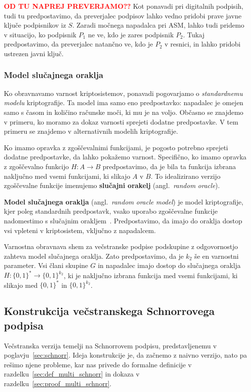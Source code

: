 \documentclass[isrm2, tisk]{fmfdelo}
\newcommand{\todo}[1]{\textcolor{red}{\textbf{\uppercase{#1}??}}}
\begin{document}
\todo{od tu naprej preverjamo}
Kot ponavadi pri digitalnih podpisih, tudi tu predpostavimo, da preverjalec podpisov lahko vedno 
pridobi prave javne ključe podpisnikov iz $S$. Zaradi močnega napadalca pri ASM, lahko tudi pridemo 
v situacijo, ko podpisnik $P_1$ ne ve, kdo je zares podpisnik $P_2$. Tukaj predpostavimo, da preverjalec
natančno ve, kdo je $P_2$ v resnici, in lahko pridobi ustrezen javni ključ. 

\subsubsection{Model slučajnega oraklja}
Ko obravnavamo varnost kriptosistemov, ponavadi pogovarjamo o \textit{standardnemu modelu} kriptografije. 
Ta model ima samo eno predpostavko: napadalec je omejen samo s časom in količino računske moči, ki mu 
je na voljo. Občasno se znajdemo v primeru, ko moramo za dokaz varnosti sprejeti dodatne predpostavke. 
V tem primeru se znajdemo v alternativnih modelih kriptografije. 

Ko imamo opravka z zgoščevalnimi funkcijami, je pogosto potrebno sprejeti dodatne predpostavke, da lahko 
pokažemo varnost. Specifično, ko imamo opravka z zgoščevalno funkcijo $H: A \rightarrow B$ predpostavimo, 
da je bila ta funkcija izbrana naključno med vsemi funkcijami, ki slikajo $A$ v $B$. To idealizirano 
verzijo zgoščevalne funkcije imenujemo \textbf{slučajni orakelj} (angl.\ \textit{random oracle}).

\textbf{Model slučajnega oraklja} (angl.\ \textit{random oracle model}) je model kriptografije, kjer poleg 
standardnih predpostavk, vsako uporabo zgoščevalne funkcije nadomestimo s slučajnim 
orakljem~\cite{boneh2023appcry}. Predpostavimo, da imajo do oraklja dostop vsi vpleteni v kriptosistem, 
vključno z napadalcem.

\begin{definicija}
    Varnostna obravnava shem za večstranske podpise podskupine z odgovornostjo zahteva model slučajnega 
    oraklja. Zato predpostavimo, da je $k_2$ še en varnostni parameter. Vsi člani skupine $G$ in 
    napadalec imajo dostop do slučajnega oraklja $H: \{0, 1\}^* \rightarrow \{0, 1\}^{k_2}$, ki je 
    naključno izbrana funkcija med vsemi funkcijami, ki slikajo med $\{0, 1\}^*$ in $\{0, 1\}^{k_2}$.
\end{definicija}

\subsection{Konstrukcija večstranskega Schnorrovega podpisa}
Večstranska verzija temelji na Schnorrovem podpisu, predstavljenemu v poglavju~\ref{sec:schnorr}. 
Ideja konstrukcije je, da začnemo z naivno verzijo, nato pa rešimo njene probleme, kar nas 
privede do formalne definicije v razdelku~\ref{sec:def_multi_schnorr} in dokaza v 
razdelku~\ref{sec:proof_multi_schnorr}.
\end{document}
